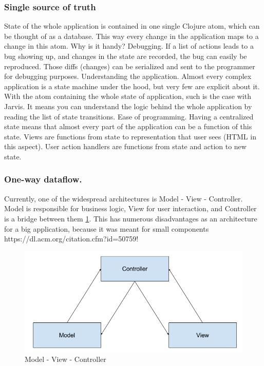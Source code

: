 \documentclass[11pt]{scrartcl}
\begin{document}
\subsubsection{Single source of truth}
State of the whole application is contained in one single Clojure atom, which can be thought of as a database. This way every change in the application maps to a change in this atom. Why is it handy?
Debugging. If a list of actions leads to a bug showing up, and changes in the state are recorded, the bug can easily be reproduced. Those diffs (changes) can be serialized and sent to the programmer for debugging purposes. 
Understanding the application. Almost every complex application is a state machine under the hood, but very few are explicit about it. With the atom containing the whole state of application, such is the case with Jarvis. It means you can understand the logic behind the whole application by reading the list of state transitions.
Ease of programming. Having a centralized state means that almost every part of the application can be a function of this state. Views are functions from state to representation that user sees (HTML in this aspect). User action handlers are functions from state and action to new state.

\subsubsection{One-way dataflow.}
Currently, one of the widespread architectures is Model - View - Controller. Model is responsible for business logic, View for user interaction, and Controller is a bridge between them \ref{mvc}. This has numerous disadvantages as an architecture for a big application, because it was meant for small components {https://dl.acm.org/citation.cfm?id=50759}!
\begin{figure}[hbt]
  \includegraphics[scale=0.3]{img/MVC}
  \caption{Model - View - Controller}
  \label{mvc}
\end{figure}
\end{document}
